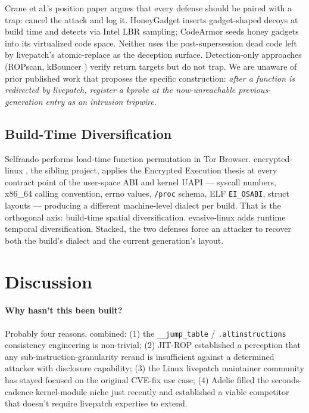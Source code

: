 \documentclass[10pt,letterpaper]{article}
\begin{document}
Crane et al.'s position paper \cite{boobytrap} argues that every
defense should be paired with a trap: cancel the attack and log it.
HoneyGadget \cite{honeygadget} inserts gadget-shaped decoys at build
time and detects via Intel LBR sampling; CodeArmor \cite{codearmor}
seeds honey gadgets into its virtualized code space. Neither uses
the post-supersession dead code left by livepatch's atomic-replace as
the deception surface. Detection-only approaches (ROPscan, kBouncer
\cite{kbouncer}) verify return targets but do not trap. We are
unaware of prior published work that proposes the specific
construction: \emph{after a function is redirected by livepatch,
register a kprobe at the now-unreachable previous-generation entry as
an intrusion tripwire}.

\subsection{Build-Time Diversification}

Selfrando \cite{selfrando} performs load-time function permutation
in Tor Browser. encrypted-linux \cite{encrypted_linux}, the sibling
project, applies the Encrypted Execution thesis
\cite{encrypted_execution} at every contract point of the user-space
ABI and kernel UAPI --- syscall numbers, x86\_64 calling convention,
errno values, \texttt{/proc} schema, ELF \texttt{EI\_OSABI}, struct
layouts --- producing a different machine-level dialect per build.
That is the orthogonal axis: build-time spatial diversification.
evasive-linux adds runtime temporal diversification. Stacked, the two
defenses force an attacker to recover both the build's dialect and
the current generation's layout.

\section{Discussion}
\label{sec:discussion}

\paragraph{Why hasn't this been built?} Probably four reasons,
combined: (1) the \texttt{\_\_jump\_table} / \texttt{.altinstructions}
consistency engineering is non-trivial; (2) JIT-ROP \cite{jit_rop}
established a perception that any sub-instruction-granularity rerand
is insufficient against a determined attacker with disclosure
capability; (3) the Linux livepatch maintainer community has stayed
focused on the original CVE-fix use case; (4) Adelie \cite{adelie}
filled the seconds-cadence kernel-module niche just recently and
established a viable competitor that doesn't require livepatch
expertise to extend.
\end{document}
